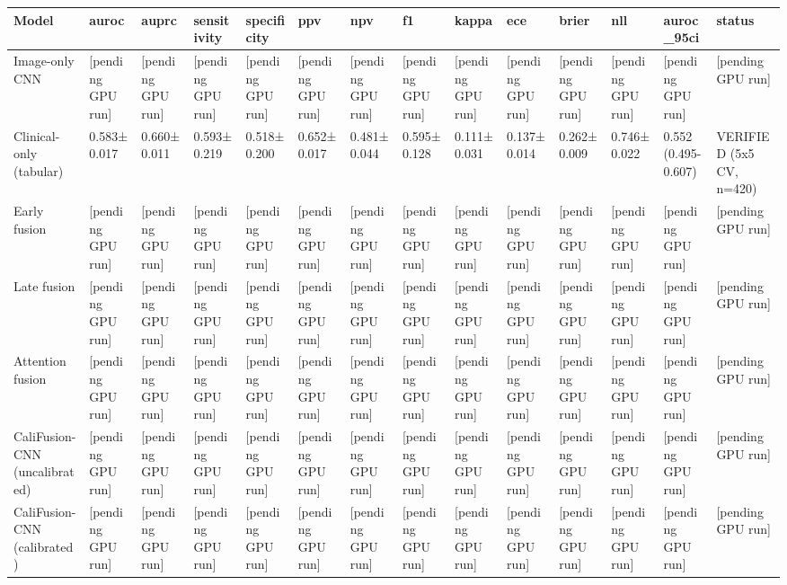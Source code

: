 \begin{tabular}{llllllllllllll}
\toprule
Model & auroc & auprc & sensitivity & specificity & ppv & npv & f1 & kappa & ece & brier & nll & auroc\_95ci & status \\
\midrule
Image-only CNN & [pending GPU run] & [pending GPU run] & [pending GPU run] & [pending GPU run] & [pending GPU run] & [pending GPU run] & [pending GPU run] & [pending GPU run] & [pending GPU run] & [pending GPU run] & [pending GPU run] & [pending GPU run] & [pending GPU run] \\
Clinical-only (tabular) & 0.583±0.017 & 0.660±0.011 & 0.593±0.219 & 0.518±0.200 & 0.652±0.017 & 0.481±0.044 & 0.595±0.128 & 0.111±0.031 & 0.137±0.014 & 0.262±0.009 & 0.746±0.022 & 0.552 (0.495-0.607) & VERIFIED (5x5 CV, n=420) \\
Early fusion & [pending GPU run] & [pending GPU run] & [pending GPU run] & [pending GPU run] & [pending GPU run] & [pending GPU run] & [pending GPU run] & [pending GPU run] & [pending GPU run] & [pending GPU run] & [pending GPU run] & [pending GPU run] & [pending GPU run] \\
Late fusion & [pending GPU run] & [pending GPU run] & [pending GPU run] & [pending GPU run] & [pending GPU run] & [pending GPU run] & [pending GPU run] & [pending GPU run] & [pending GPU run] & [pending GPU run] & [pending GPU run] & [pending GPU run] & [pending GPU run] \\
Attention fusion & [pending GPU run] & [pending GPU run] & [pending GPU run] & [pending GPU run] & [pending GPU run] & [pending GPU run] & [pending GPU run] & [pending GPU run] & [pending GPU run] & [pending GPU run] & [pending GPU run] & [pending GPU run] & [pending GPU run] \\
CaliFusion-CNN (uncalibrated) & [pending GPU run] & [pending GPU run] & [pending GPU run] & [pending GPU run] & [pending GPU run] & [pending GPU run] & [pending GPU run] & [pending GPU run] & [pending GPU run] & [pending GPU run] & [pending GPU run] & [pending GPU run] & [pending GPU run] \\
CaliFusion-CNN (calibrated) & [pending GPU run] & [pending GPU run] & [pending GPU run] & [pending GPU run] & [pending GPU run] & [pending GPU run] & [pending GPU run] & [pending GPU run] & [pending GPU run] & [pending GPU run] & [pending GPU run] & [pending GPU run] & [pending GPU run] \\
\bottomrule
\end{tabular}
